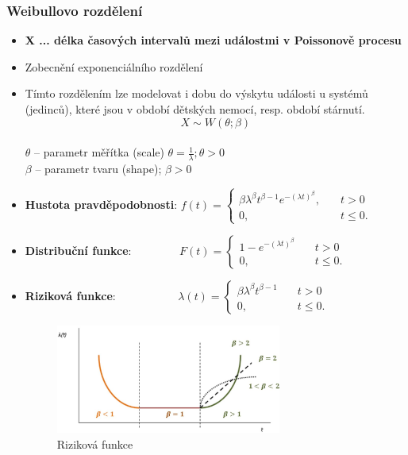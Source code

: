 \subsubsection{Weibullovo rozdělení}
\begin{itemize}
	\item \textbf{X ... délka časových intervalů mezi událostmi v Poissonově procesu}
	\item Zobecnění exponenciálního rozdělení
	\item Tímto rozdělením lze modelovat i dobu do výskytu události u systémů (jedinců), které jsou v období dětských nemocí, resp. období stárnutí.
	$$X \sim W(\theta;\beta)$$
	\\ $\theta$ -- parametr měřítka (scale) $\theta = \frac{1}{\lambda}; \theta > 0$ \\ $\beta$ -- parametr tvaru (shape); $\beta > 0$
	\item \textbf{Hustota pravděpodobnosti}:
	 $f(t) =	\begin{cases}
 			   \beta\lambda^{\beta} t^{\beta-1}e^{-(\lambda t)^{\beta}},       & \quad t > 0\\
 			   0,  & \quad t \leq 0.
 			 \end{cases}$
	\item \textbf{Distribuční funkce}:
	$\qquad\qquad F(t) =	\begin{cases}
 			   1 -  e^{-(\lambda t)^{\beta} }      & \quad t > 0\\
 			   0,  & \quad t \leq 0.
 			 \end{cases}$
 	\item \textbf{Riziková funkce}:
	$\qquad\qquad\quad\; \lambda(t) =	\begin{cases}
 			   \beta\lambda^\beta t^{\beta-1}      & \quad t > 0\\
 			   0,  & \quad t \leq 0.
 			 \end{cases}$
 	\begin{figure}[H]
	\centering
	\includegraphics[width=0.7\textwidth]{assets/12_weib_riz_fce}
	\caption{Riziková funkce}
	\end{figure}
\end{itemize}
